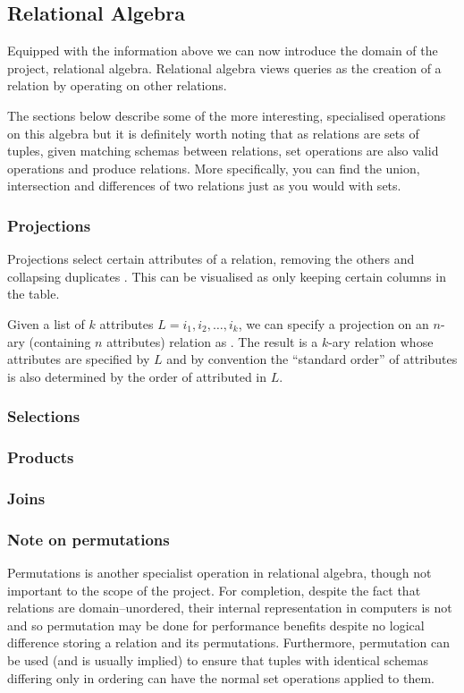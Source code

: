 \subsection{Relational Algebra}
Equipped with the information above we can now introduce the domain of the project, relational algebra. Relational algebra views queries as the creation of a relation by operating on other relations.\cite{RelationalCalculus}

The sections below describe some of the more interesting, specialised operations on this algebra but it is definitely worth noting that as relations are sets  of tuples, given matching schemas between relations, set operations are also valid operations and produce relations.\cite{RelationalModel} More specifically, you can find the union, intersection and differences of two relations just as you would with sets. \cite{DatabaseSystems}
\subsubsection{Projections}
Projections select certain attributes of a relation, removing the others and collapsing duplicates .\cite{RelationalModel} This can be visualised as only keeping certain columns in the table.

Given a list of $k$ attributes $L = i_1, i_2, \ldots, i_k$, we can specify a projection on an $n$-ary (containing $n$ attributes) relation  as . The result is a $k$-ary relation whose attributes are specified by $L$ \cite{RelationalModel} and by convention the ``standard order'' of attributes is also determined by the order of attributed in $L$.\cite{DatabaseSystems}
\subsubsection{Selections}
\subsubsection{Products}
\subsubsection{Joins}
\subsubsection{Note on permutations}
Permutations is another specialist operation in relational algebra, though not important to the scope of the project. For completion, despite the fact that relations are domain--unordered, their internal representation in computers is not and so permutation may be done for performance benefits despite no logical difference storing a relation and its permutations.\cite{RelationalModel} Furthermore, permutation can be used (and is usually implied) to ensure that tuples with identical schemas differing only in ordering can have the normal set operations applied to them. \cite{DatabaseSystems}